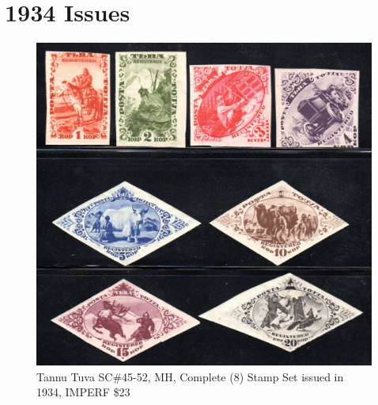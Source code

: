 \section{1934 Issues}

\begin{fullwidth}
\begin{figure}[htp]
\includegraphics[width=.95\textwidth]{../tannu-tuva/1934-imperforate.jpg}
\caption{
Tannu Tuva SC\#45-52, MH, Complete (8) Stamp Set issued in 1934, IMPERF \$23 }
\end{figure}
\end{fullwidth}






                                                    